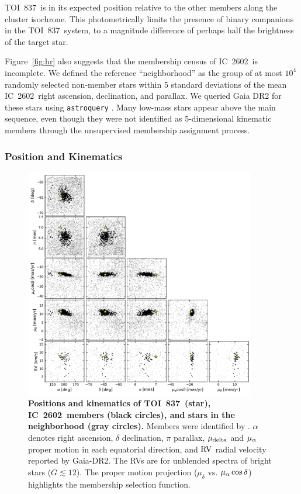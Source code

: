 \documentclass[12pt,twocolumn,tighten]{aastex62}
\newcommand{\tn}{TOI~837} %
\newcommand{\cn}{IC~2602} %
\begin{document}
\tn\ is in its expected position relative to the other members along
the cluster isochrone.  This photometrically limits the presence of
binary companions in the \tn\ system, to a magnitude difference of
perhaps half the brightness of the target star.

Figure~\ref{fig:hr} also suggests that the membership census of \cn\
is incomplete.  We defined the reference ``neighborhood'' as the group
of at most $10^4$ randomly selected non-member stars within 5 standard
deviations of the mean \cn\ right ascension, declination, and
parallax.  We queried Gaia DR2 for these stars using
\texttt{astroquery} \citep{astroquery_2018}.  Many low-mass stars
appear above the main sequence, even though they were not identified
as 5-dimensional kinematic members through the unsupervised
\citet{cantat-gaudin_gaia_2018} membership assignment process.


\subsubsection{Position and Kinematics}

\begin{figure}[t!]
	\begin{center}
		\leavevmode
		\includegraphics[width=0.9\textwidth]{f8.pdf}
	\end{center}
	\vspace{-0.7cm}
	\caption{ 
  {\bf Positions and kinematics of \tn\ (star), \cn\ members (black
  circles), and stars in the neighborhood (gray circles).} Members
  were identified by \citet{cantatgaudin_gaia_2018}.  $\alpha$ denotes
  right ascension, $\delta$ declination, $\pi$ parallax, $\mu_{\rm
  delta}$ and $\mu_{\rm \alpha}$ proper motion in each equatorial
  direction, and ${\rm RV}$ radial velocity reported by Gaia-DR2.  The
  RVs are for unblended spectra of bright stars ($G\lesssim 12$).  The
  proper motion projection ($\mu_{\delta}$ vs{.} $\mu_{\rm
  \alpha}\cos\delta$) highlights the membership selection function.
  \label{fig:full_kinematics}
	}
\end{figure}
\end{document}
